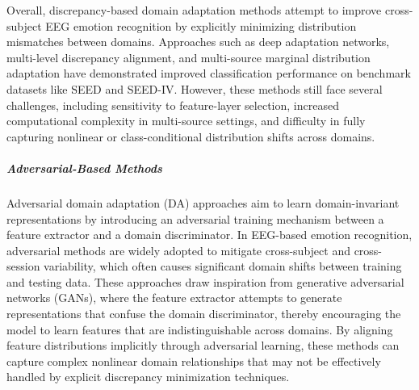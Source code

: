 \documentclass{WileyMSP-template}
\begin{document}
Overall, discrepancy-based domain adaptation methods attempt to improve cross-subject EEG emotion recognition by explicitly minimizing distribution mismatches between domains. Approaches such as deep adaptation networks, multi-level discrepancy alignment, and multi-source marginal distribution adaptation have demonstrated improved classification performance on benchmark datasets like SEED and SEED-IV. However, these methods still face several challenges, including sensitivity to feature-layer selection, increased computational complexity in multi-source settings, and difficulty in fully capturing nonlinear or class-conditional distribution shifts across domains.
\subparagraph{Adversarial-Based Methods}
Adversarial domain adaptation (DA) approaches aim to learn domain-invariant representations by introducing an adversarial training mechanism between a feature extractor and a domain discriminator. In EEG-based emotion recognition, adversarial methods are widely adopted to mitigate cross-subject and cross-session variability, which often causes significant domain shifts between training and testing data. These approaches draw inspiration from generative adversarial networks (GANs), where the feature extractor attempts to generate representations that confuse the domain discriminator, thereby encouraging the model to learn features that are indistinguishable across domains. By aligning feature distributions implicitly through adversarial learning, these methods can capture complex nonlinear domain relationships that may not be effectively handled by explicit discrepancy minimization techniques.
\end{document}
